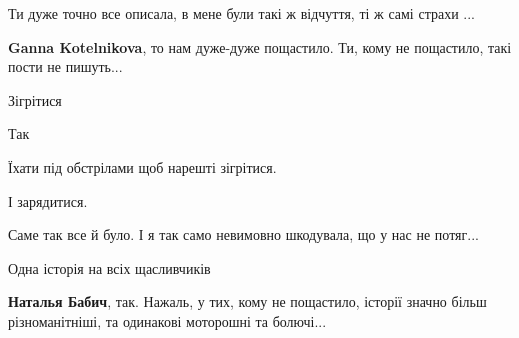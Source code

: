  
 
 
 
 

\qqSecCmt


Ти дуже точно все описала, в мене були такі ж відчуття, ті ж самі страхи ...

\begin{itemize} %
\textbf{Ganna Kotelnikova}, то нам дуже-дуже пощастило. Ти, кому не пощастило, такі пости не пишуть...
\end{itemize} %


Зігрітися

Так

Їхати під обстрілами щоб нарешті зігрітися.

І зарядитися.


Саме так все й було. І я так само невимовно шкодувала, що у нас не потяг...


Одна історія на всіх щасливчиків

\begin{itemize} %
\textbf{Наталья Бабич}, так. Нажаль, у тих, кому не пощастило, історії значно більш різноманітніші, та одинакові моторошні та болючі...
\end{itemize} %
